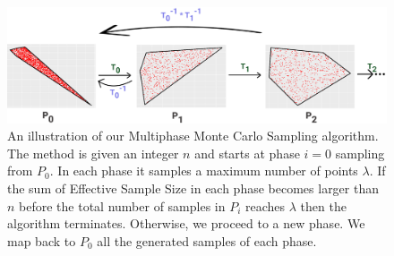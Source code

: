    \begin{figure}[!htbp]
      \includegraphics[width=1.0\columnwidth]{figures/sampling_extra_phase_croped.png}
      \caption[A Multiphase Monte Carlo Sampling algorithm]{
         An illustration of our Multiphase Monte Carlo Sampling algorithm. The method is given an integer $n$ and starts at phase $i=0$ sampling from $P_0$. In each phase it samples a maximum number of points $\lambda$. If the sum of Effective Sample Size in each phase becomes larger than $n$ before the total number of samples in $P_i$ reaches $\lambda$ then the algorithm terminates. Otherwise, we proceed to a  new phase.
    We map back to $P_0$ all the generated samples of each phase.
      }
      \label{fig:mmcs_phases}
   \end{figure}




